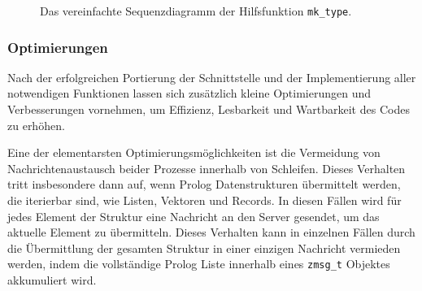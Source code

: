 \begin{figure}[!ht]
  \caption{Das vereinfachte Sequenzdiagramm der Hilfsfunktion \texttt{mk\_type}.}
  \label{fig:mk-type-sequence}
\end{figure}

\subsubsection{Optimierungen}
\label{subsec:optimizations}

Nach der erfolgreichen Portierung der Schnittstelle und der Implementierung aller notwendigen Funktionen
lassen sich zusätzlich kleine Optimierungen und Verbesserungen vornehmen, um Effizienz, Lesbarkeit und Wartbarkeit des Codes zu erhöhen.

Eine der elementarsten Optimierungsmöglichkeiten ist die Vermeidung von Nachrichtenaustausch beider Prozesse
innerhalb von Schleifen. Dieses Verhalten tritt insbesondere dann auf, wenn Prolog Datenstrukturen übermittelt werden,
die iterierbar sind, wie Listen, Vektoren und Records.
In diesen Fällen wird für jedes Element der Struktur eine Nachricht an den Server gesendet,
um das aktuelle Element zu übermitteln.
Dieses Verhalten kann in einzelnen Fällen durch die Übermittlung der gesamten Struktur in einer einzigen Nachricht vermieden werden,
indem die vollständige Prolog Liste innerhalb eines \texttt{zmsg\_t} Objektes akkumuliert wird.


